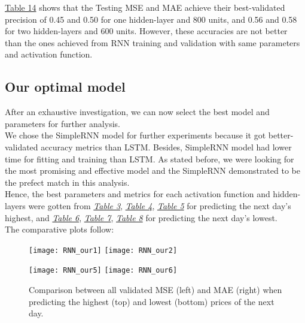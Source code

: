 \hyperref[table:Results for LSTM, Tanh, Low]{Table 14} shows that the Testing MSE and MAE achieve their best-validated precision of 0.45 and 0.50 for one hidden-layer and 800 units, and 0.56 and 0.58 for two hidden-layers and 600 units. However, these accuracies are not better than the ones achieved from RNN training and validation with same parameters and activation function.\\

\subsection{Our optimal model}
\label{chap:Our optimal model}

\quad After an exhaustive investigation, we can now select the best model and parameters for further analysis.\\

We chose the SimpleRNN model for further experiments because it got better-validated accuracy metrics than LSTM. Besides, SimpleRNN model had lower time for fitting and training than LSTM. As stated before, we were looking for the most promising and effective model and the SimpleRNN demonstrated to be the prefect match in this analysis.\\

Hence, the best parameters and metrics for each activation function and hidden-layers were gotten from \hyperref[table:Results for RNN, Sigmoid, High]{\textit{Table 3}}, \hyperref[table:Results for RNN, Tanh, High]{\textit{Table 4}}, \hyperref[table:Results for RNN, ReLu, High]{\textit{Table 5}} for predicting the next day's highest, and \hyperref[table:Results for RNN, Sigmoid, Low]{\textit{Table 6}}, \hyperref[table:Results for RNN, Tanh, Low]{\textit{Table 7}}, \hyperref[table:Results for RNN, ReLu, Low]{\textit{Table 8}} for predicting the next day's lowest.\\

The comparative plots follow:

\begin{figure}[H]
\label{fig:RNN Comparison for highest}
\centering
\texttt{[image: RNN\_our1]}
\texttt{[image: RNN\_our2]}
\end{figure}

\begin{figure}[H]
\label{fig:RNN Comparison for lowest}
\centering
\texttt{[image: RNN\_our5]}
\texttt{[image: RNN\_our6]}
\caption{Comparison between all validated MSE (left) and MAE (right) when predicting the highest (top) and lowest (bottom) prices of the next day.}
\end{figure}\\

